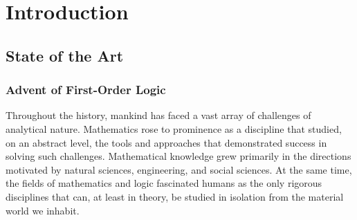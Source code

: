 
\chapter{Introduction}





\section{State of the Art}
\label{sec:sota}


\subsection{Advent of First-Order Logic}


Throughout the history, mankind has faced a vast array of challenges of analytical nature.
Mathematics rose to prominence as a discipline that studied, on an abstract level, the tools and approaches that demonstrated success in solving such challenges.
Mathematical knowledge grew primarily in the directions motivated by
natural sciences, engineering, and social sciences.
At the same time, the fields of mathematics and logic
fascinated humans
as the only rigorous disciplines that can, at least in theory, be studied in isolation from the material world we inhabit.


